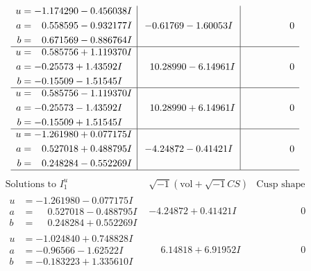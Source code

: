 \documentclass[1p]{elsarticle_modified}
\theoremstyle{definition}
\newcommand{\I}{\sqrt{-1}}
\begin{document}
$$\begin{array}{c|c|c}
\begin{aligned}
u &= -1.174290 - 0.456038 I \\
a &= \phantom{-}0.558595 - 0.932177 I \\
b &= \phantom{-}0.671569 - 0.886764 I\end{aligned}
 & -0.61769 - 1.60053 I & \phantom{-0.000000 } 0 \\ \hline\begin{aligned}
u &= \phantom{-}0.585756 + 1.119370 I \\
a &= -0.25573 + 1.43592 I \\
b &= -0.15509 - 1.51545 I\end{aligned}
 & \phantom{-}10.28990 - 6.14961 I & \phantom{-0.000000 } 0 \\ \hline\begin{aligned}
u &= \phantom{-}0.585756 - 1.119370 I \\
a &= -0.25573 - 1.43592 I \\
b &= -0.15509 + 1.51545 I\end{aligned}
 & \phantom{-}10.28990 + 6.14961 I & \phantom{-0.000000 } 0 \\ \hline\begin{aligned}
u &= -1.261980 + 0.077175 I \\
a &= \phantom{-}0.527018 + 0.488795 I \\
b &= \phantom{-}0.248284 - 0.552269 I\end{aligned}
 & -4.24872 - 0.41421 I & \phantom{-0.000000 } 0\\
 \hline 
 \end{array}$$\newpage$$\begin{array}{c|c|c}  
\text{Solutions to }I^u_{1}& \I (\text{vol} + \sqrt{-1}CS) & \text{Cusp shape}\\
 \hline 
\begin{aligned}
u &= -1.261980 - 0.077175 I \\
a &= \phantom{-}0.527018 - 0.488795 I \\
b &= \phantom{-}0.248284 + 0.552269 I\end{aligned}
 & -4.24872 + 0.41421 I & \phantom{-0.000000 } 0 \\ \hline\begin{aligned}
u &= -1.024840 + 0.748828 I \\
a &= -0.96566 - 1.62522 I \\
b &= -0.183223 + 1.335610 I\end{aligned}
 & \phantom{-}6.14818 + 6.91952 I & \phantom{-0.000000 } 0 \\ \hline\begin{aligned}

\end{aligned}
\end{array}$$
\end{document}
